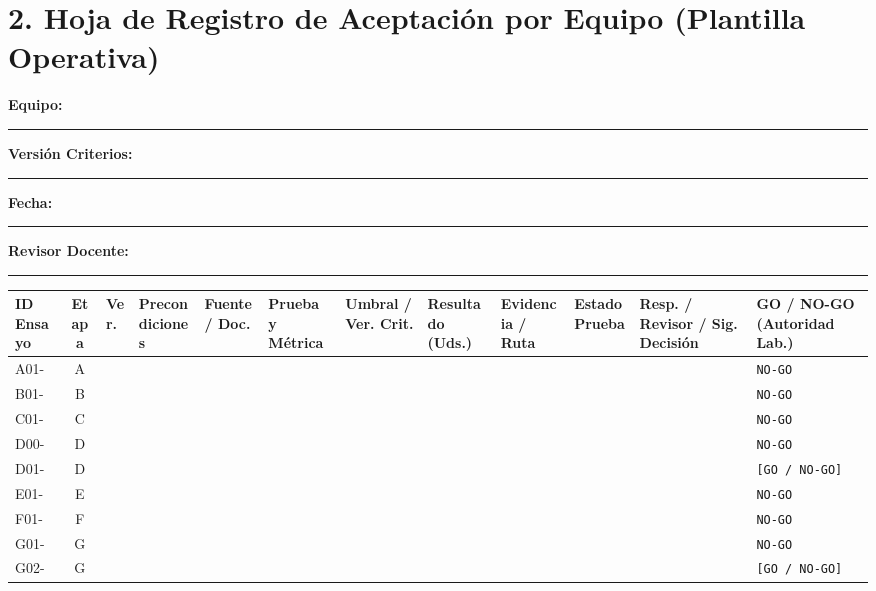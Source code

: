 \documentclass[10pt, a4paper, landscape]{article}
\begin{document}
\newpage
\section*{2. Hoja de Registro de Aceptación por Equipo (Plantilla Operativa)}

\noindent\textbf{Equipo:} \rule{3.5cm}{0.15mm} \hfill
\textbf{Versión Criterios:} \rule{3.5cm}{0.15mm} \hfill
\textbf{Fecha:} \rule{3.5cm}{0.15mm} \hfill
\textbf{Revisor Docente:} \rule{4.5cm}{0.15mm}

\vspace{0.2cm}
\begingroup
\tiny
\setlength{\tabcolsep}{2.5pt}
\renewcommand{\arraystretch}{1.6}
\noindent\begin{tabularx}{\textwidth}{|l|c|l|>{\hsize=0.90\hsize\raggedright\arraybackslash}X|>{\hsize=0.90\hsize\raggedright\arraybackslash}X|>{\hsize=1.00\hsize\raggedright\arraybackslash}X|>{\hsize=0.95\hsize\raggedright\arraybackslash}X|>{\hsize=1.05\hsize\raggedright\arraybackslash}X|>{\hsize=1.00\hsize\raggedright\arraybackslash}X|>{\hsize=0.95\hsize\raggedright\arraybackslash}X|>{\hsize=1.15\hsize\raggedright\arraybackslash}X|>{\hsize=1.10\hsize\raggedright\arraybackslash}X|}
\hline
\rowcolor{ucbblue!15}
\textbf{ID Ensayo} & \textbf{Etapa} & \textbf{Ver.} & \textbf{Precondiciones} & \textbf{Fuente / Doc.} & \textbf{Prueba y Métrica} & \textbf{Umbral / Ver. Crit.} & \textbf{Resultado (Uds.)} & \textbf{Evidencia / Ruta} & \textbf{Estado Prueba} & \textbf{Resp. / Revisor / Sig. Decisión} & \textbf{GO / NO-GO (Autoridad Lab.)} \\ \hline
A01- & A & & & & & & & & & & \texttt{NO-GO} \\[0.35cm] \hline
B01- & B & & & & & & & & & & \texttt{NO-GO} \\[0.35cm] \hline
C01- & C & & & & & & & & & & \texttt{NO-GO} \\[0.35cm] \hline
D00- & D & & & & & & & & & & \texttt{NO-GO} \\[0.35cm] \hline
D01- & D & & & & & & & & & & \texttt{[GO / NO-GO]} \\[0.35cm] \hline
E01- & E & & & & & & & & & & \texttt{NO-GO} \\[0.35cm] \hline
F01- & F & & & & & & & & & & \texttt{NO-GO} \\[0.35cm] \hline
G01- & G & & & & & & & & & & \texttt{NO-GO} \\[0.35cm] \hline
G02- & G & & & & & & & & & & \texttt{[GO / NO-GO]} \\[0.35cm] \hline
\end{tabularx}\par
\endgroup
\end{document}
